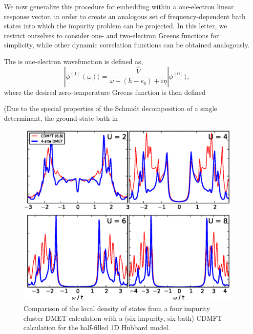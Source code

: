 \documentclass[aps,showpacs,twocolumn,nobibnotes]{revtex4}
\begin{document}
We now generalize this procedure for embedding within a one-electron linear response vector, in order to create an analogous set of frequency-dependent bath states
into which the impurity problem can be projected. In this letter, we restrict ourselves to consider one- and two-electron Greens functions for simplicity, 
while other dynamic correlation functions can be obtained analogously.

The is one-electron wavefunction is defined as,
\begin{equation}
    |\phi^{(1)}(\omega) \rangle = \frac{{\hat V} }{\omega-(h-e_0)+i\eta}|\phi^{(0)}\rangle  , \label{nonintGF}
\end{equation}
where the desired zero-temperature Greens function is then defined



(Due to the special properties of the Schmidt decomposition of a single determinant, the ground-state bath in 


\begin{figure}
\begin{center}
\includegraphics[scale=0.475]{Plots/1D_Spectra/1D_Hub_Spectra.eps}
\end{center}
\caption{Comparison of the local density of states from a four impurity cluster DMET calculation with a
(six impurity, six bath) CDMFT calculation for the half-filled 1D Hubbard model.}
\label{1D_DOS}
\end{figure}
\end{document}
